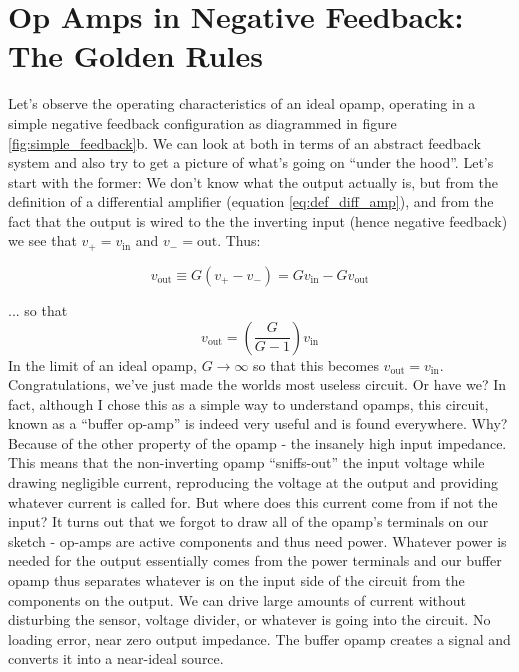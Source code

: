\documentclass{tufte-book}
\begin{document}
\section{Op Amps in Negative Feedback: The Golden Rules}
Let's observe the operating characteristics of an ideal opamp, operating in a simple negative feedback configuration as diagrammed in figure \ref{fig:simple_feedback}b. We can look at both in terms of an abstract feedback system and also try to get a picture of what's going on ``under the hood''. Let's start with the former: We don't know what the output actually is, but from the definition of a differential amplifier (equation \ref{eq:def_diff_amp}), and from the fact that the output is wired to the the inverting input (hence negative feedback) we see that $v_+ = v_\text{in}$ and $v_-=\text{out}$. Thus:

\begin{equation*}
v_\text{out} \equiv G\left(v_+ - v_-\right)  = Gv_\text{in} - Gv_\text{out}
\end{equation*}

\noindent ... so that 
\begin{equation}
\label{eq:opamp_analysis_feedback}
v_\text{out} = \left(\frac{G}{G-1}\right)v_\text{in}
\end{equation}
In the limit of an ideal opamp, $G\rightarrow\infty$ so that this becomes $v_\text{out} = v_\text{in}$. Congratulations, we've just made the worlds most useless circuit. Or have we? In fact, although I chose this as a simple way to understand opamps, this circuit, known as a ``buffer op-amp'' is indeed very useful and is found everywhere. Why? Because of the other property of the opamp - the insanely high input impedance. This means that the non-inverting opamp ``sniffs-out'' the input voltage while drawing negligible current, reproducing the voltage at the output and providing whatever current is called for. But where does this current come from if not the input? It turns out that we forgot to draw all of the opamp's terminals on our sketch - op-amps are active components and thus need power. Whatever power is needed for the output essentially comes from the power terminals and our buffer opamp thus separates whatever is on the input side of the circuit from the components on the output. We can drive large amounts of current without disturbing the sensor, voltage divider, or whatever is going into the circuit. No loading error, near zero output impedance. The buffer opamp creates a signal and converts it into a near-ideal source.
\end{document}
